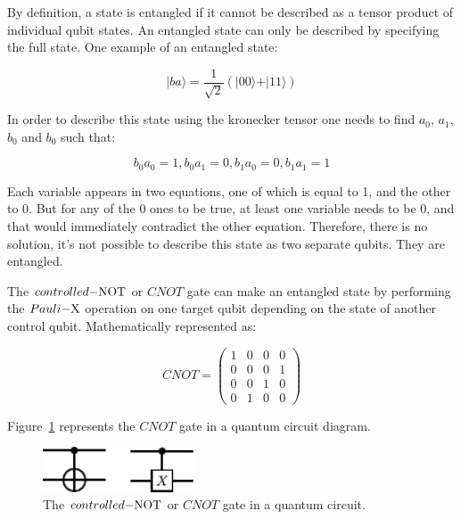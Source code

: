 By definition, a state is entangled if it cannot be described as a tensor product
of individual qubit states. An entangled state can only be described by specifying 
the full state. One example of an entangled state:

\begin{linenomath}
\begin{equation}
	\vert ba \rangle = \frac{1}{\sqrt{2}} (\vert 00 \rangle + \vert 11 \rangle)
\label{eq:entg}
\end{equation}
\end{linenomath}

In order to describe this state using the kronecker tensor one needs to find 
$a_0$, $a_1$, $b_0$ and $b_0$ such that: 

\begin{linenomath}
\begin{equation}
b_0a_0=1,
b_0a_1=0, 
b_1a_0=0,
b_1a_1=1
\label{eq:entgcond}
\end{equation}
\end{linenomath}

Each variable appears in two equations, one of which is equal to 1, and the other
to 0. But for any of the 0 ones to be true, at least one variable needs to be 0,
and that would immediately contradict the other equation. Therefore, there is no
solution, it's not possible to describe this state as two separate qubits. They 
are entangled.

The $controlled\rm{-}NOT$ or $CNOT$ gate can make an entangled state by performing 
the $Pauli\rm{-}X$ operation on one target qubit depending on the state of 
another control qubit. Mathematically represented as:

\begin{linenomath}
\begin{equation}
CNOT = \begin{pmatrix}
1 & 0 & 0 & 0 \\
0 & 0 & 0 & 1 \\
0 & 0 & 1 & 0 \\
0 & 1 & 0 & 0 
\end{pmatrix}
\label{eq:cnot}
\end{equation}
\end{linenomath}

Figure~\ref{fig:cnot} represents the $CNOT$ gate in a quantum circuit diagram.

\begin{figure}[!htbp]
\centering
	\includegraphics[width=0.40\textwidth]{figures/CNOT.pdf}
\caption{The $controlled\rm{-}NOT$ or $CNOT$ gate in a quantum circuit.}
\label{fig:cnot}
\end{figure}

